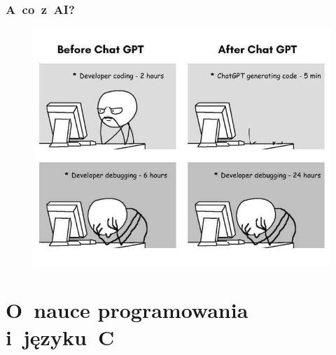 \documentclass[10pt,t]{beamer}
\begin{document}
\begin{frame}
  \frametitle{A~co~z~AI?}

  \vspace{-0.5em}


  \begin{figure}

    \label{fig:Impact-of-ChatGPT-One-view}

    \centering


    \includegraphics[scale=0.38]
    {./Presentations-pictures/Impact-of-ChatGPT-One-view.jpg}

  \end{figure}

\end{frame}




















\section{O~nauce programowania i~języku~C}
\end{document}
